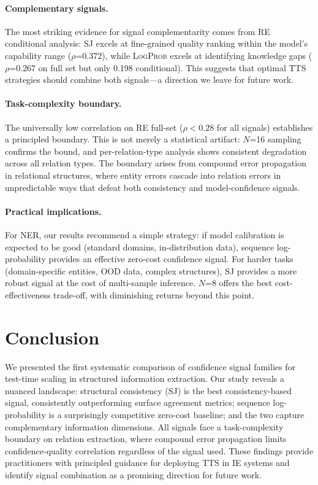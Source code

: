 \documentclass[11pt,a4paper]{article}
\newcommand{\SJ}{\textsc{SJ}}
\newcommand{\LP}{\textsc{LogProb}}
\begin{document}
\paragraph{Complementary signals.}
The most striking evidence for signal complementarity comes from RE conditional analysis: \SJ{} excels at fine-grained quality ranking within the model's capability range ($\rho$=0.372), while \LP{} excels at identifying knowledge gaps ($\rho$=0.267 on full set but only 0.198 conditional).
This suggests that optimal TTS strategies should combine both signals---a direction we leave for future work.

\paragraph{Task-complexity boundary.}
The universally low correlation on RE full-set ($\rho < 0.28$ for all signals) establishes a principled boundary.
This is not merely a statistical artifact: $N$=16 sampling confirms the bound, and per-relation-type analysis shows consistent degradation across all relation types.
The boundary arises from compound error propagation in relational structures, where entity errors cascade into relation errors in unpredictable ways that defeat both consistency and model-confidence signals.

\paragraph{Practical implications.}
For NER, our results recommend a simple strategy: if model calibration is expected to be good (standard domains, in-distribution data), sequence log-probability provides an effective zero-cost confidence signal.
For harder tasks (domain-specific entities, OOD data, complex structures), \SJ{} provides a more robust signal at the cost of multi-sample inference.
$N$=8 offers the best cost-effectiveness trade-off, with diminishing returns beyond this point.

\section{Conclusion}

We presented the first systematic comparison of confidence signal families for test-time scaling in structured information extraction.
Our study reveals a nuanced landscape: structural consistency (\SJ{}) is the best consistency-based signal, consistently outperforming surface agreement metrics; sequence log-probability is a surprisingly competitive zero-cost baseline; and the two capture complementary information dimensions.
All signals face a task-complexity boundary on relation extraction, where compound error propagation limits confidence-quality correlation regardless of the signal used.
These findings provide practitioners with principled guidance for deploying TTS in IE systems and identify signal combination as a promising direction for future work.
\end{document}
